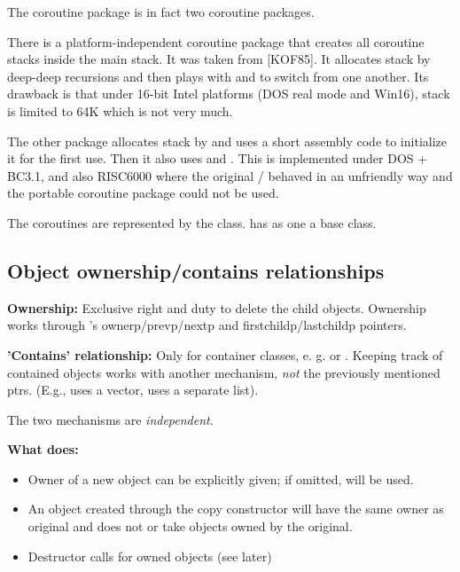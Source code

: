 The coroutine package is in fact two coroutine
packages.

There is a platform-independent coroutine package that creates all
coroutine stacks inside the main stack. It was taken from [KOF85]. It
allocates stack by deep-deep recursions and then plays with
 and  to switch from one another.
Its drawback is that under 16-bit Intel platforms (DOS real mode and
Win16), stack is limited to 64K which is not very much.


The other package allocates stack by  and uses a short 
assembly code to initialize it for the first use. Then it also 
uses  and . This is implemented under DOS + BC3.1, 
and also RISC6000 where the original  /  behaved 
in an unfriendly way and the portable coroutine package could 
not be used.


The coroutines are represented by the 
class.  has  as one a
base class.





\subsection{Object ownership/contains relationships}

\textbf{Ownership:} Exclusive right and duty to delete the child
objects.  Ownership works through 's
ownerp/prevp/nextp and firstchildp/lastchildp pointers.


\textbf{'Contains' relationship:} Only
for container classes, e. g.   or .
Keeping track of contained objects works with another mechanism,
\textit{not} the previously mentioned ptrs. (E.g., 
uses a vector,  uses a separate list).

The two mechanisms are \textit{independent}.

\textbf{What  does:}
\begin{itemize}
  \item{Owner of a new object can be explicitly given; if omitted,
     will be used.}
  \item{An object created through the copy
    constructor will have the same
    owner as original and does not  or take objects owned
    by the original.}
  \item{Destructor calls  for owned objects (see later)}
\end{itemize}



